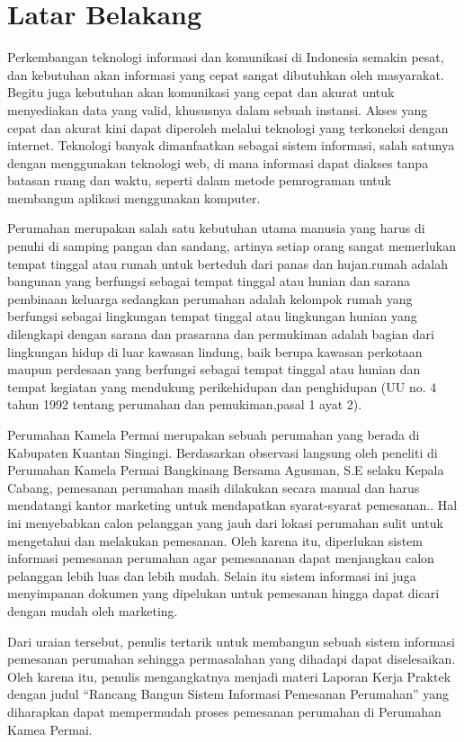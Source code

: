 \section{Latar Belakang}
Perkembangan teknologi informasi dan komunikasi di Indonesia semakin pesat, dan kebutuhan akan informasi yang cepat sangat dibutuhkan oleh masyarakat. Begitu juga kebutuhan akan komunikasi yang cepat dan akurat untuk menyediakan data yang valid, khususnya dalam sebuah instansi. Akses yang cepat dan akurat kini dapat diperoleh melalui teknologi yang terkoneksi dengan internet. Teknologi banyak dimanfaatkan sebagai sistem informasi, salah satunya dengan menggunakan teknologi web, di mana informasi dapat diakses tanpa batasan ruang dan waktu, seperti dalam metode pemrograman untuk membangun aplikasi menggunakan komputer.
\par Perumahan merupakan salah satu kebutuhan utama manusia yang harus di penuhi di samping pangan dan sandang, artinya setiap orang sangat memerlukan tempat tinggal atau rumah untuk berteduh dari panas dan hujan.rumah adalah bangunan yang berfungsi sebagai tempat tinggal atau hunian dan sarana pembinaan keluarga sedangkan perumahan adalah kelompok rumah yang berfungsi sebagai lingkungan tempat tinggal atau lingkungan hunian yang dilengkapi dengan sarana dan prasarana dan permukiman adalah bagian dari lingkungan hidup di luar kawasan lindung, baik berupa kawasan perkotaan maupun perdesaan yang berfungsi sebagai tempat tinggal atau hunian dan tempat kegiatan yang mendukung perikehidupan dan penghidupan (UU no. 4 tahun 1992 tentang perumahan dan pemukiman,pasal 1 ayat 2).
\par Perumahan Kamela Permai merupakan sebuah perumahan yang berada di Kabupaten Kuantan Singingi. Berdasarkan observasi langsung oleh peneliti di Perumahan Kamela Permai Bangkinang Bersama Agusman, S.E selaku Kepala Cabang, pemesanan perumahan masih dilakukan secara manual dan harus mendatangi kantor  marketing untuk mendapatkan syarat-syarat pemesanan.. Hal ini menyebabkan calon pelanggan yang jauh dari lokasi perumahan sulit untuk mengetahui dan melakukan pemesanan. Oleh karena itu, diperlukan sistem informasi pemesanan perumahan agar pemesananan dapat menjangkau calon pelanggan lebih luas dan lebih mudah. Selain itu sistem informasi ini juga menyimpanan dokumen yang dipelukan untuk pemesanan hingga dapat dicari dengan mudah oleh marketing.
\par Dari uraian tersebut, penulis tertarik untuk membangun sebuah sistem informasi pemesanan perumahan  sehingga permasalahan yang dihadapi dapat diselesaikan. Oleh karena itu, penulis mengangkatnya menjadi materi Laporan Kerja Praktek dengan judul “Rancang Bangun Sistem Informasi Pemesanan Perumahan” yang diharapkan dapat mempermudah proses pemesanan perumahan di Perumahan Kamea Permai.

